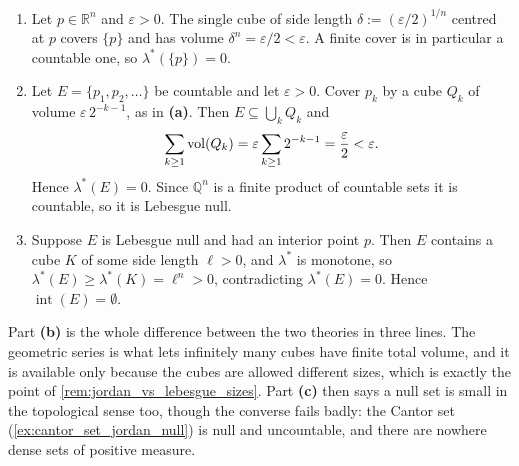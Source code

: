 \begin{exercisesolution}
\label{sol:ai_lebesgue_null_countable}
\begin{enumerate}[label=\textbf{(\alph*)}]
  \item Let $p \in \mathbb{R}^n$ and $\varepsilon > 0$. The single cube of side length
    $\delta := (\varepsilon/2)^{1/n}$ centred at $p$ covers $\{p\}$ and has volume
    $\delta^n = \varepsilon/2 < \varepsilon$. A finite cover is in particular a countable one, so
    $\lambda^*(\{p\}) = 0$.

  \item Let $E = \{p_1,p_2,\dots\}$ be countable and let $\varepsilon > 0$. Cover $p_k$ by a cube
    $Q_k$ of volume $\varepsilon\,2^{-k-1}$, as in \textbf{(a)}. Then $E \subseteq
    \bigcup_k Q_k$ and
    \[\sum_{k\ge1}\operatorname{vol}(Q_k) = \varepsilon\sum_{k\ge1}2^{-k-1} = \frac{\varepsilon}{2} < \varepsilon.\]
    Hence $\lambda^*(E) = 0$. Since $\mathbb{Q}^n$ is a finite product of countable sets it is
    countable, so it is Lebesgue null.

  \item Suppose $E$ is Lebesgue null and had an interior point $p$. Then $E$ contains a cube $K$ of
    some side length $\ell > 0$, and $\lambda^*$ is monotone, so
    $\lambda^*(E) \ge \lambda^*(K) = \ell^n > 0$, contradicting $\lambda^*(E) = 0$. Hence
    $\operatorname{int}(E) = \emptyset$.
\end{enumerate}
\begin{remark}
Part \textbf{(b)} is the whole difference between the two theories in three lines. The geometric
series is what lets infinitely many cubes have finite total volume, and it is available only
because the cubes are allowed different sizes, which is exactly the point of
\cref{rem:jordan_vs_lebesgue_sizes}. Part \textbf{(c)} then says a null set is small in the
topological sense too, though the converse fails badly: the Cantor set
(\cref{ex:cantor_set_jordan_null}) is null and uncountable, and there are nowhere dense sets of
positive measure.
\end{remark}
\end{exercisesolution}

